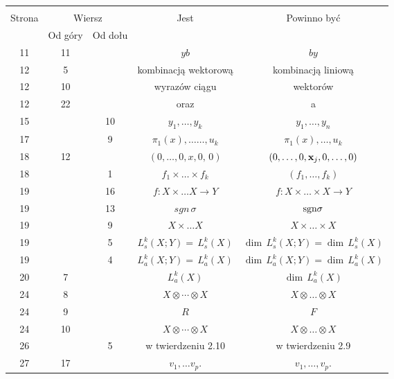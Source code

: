 \documentclass[a4paper,11pt]{article}
\begin{document}
\begin{center}

  \begin{tabular}{|c|c|c|c|c|}
    \hline
    & \multicolumn{2}{c|}{} & & \\
    Strona & \multicolumn{2}{c|}{Wiersz} & Jest
                              & Powinno być \\ \cline{2-3}
    & Od góry & Od dołu & & \\
    \hline
    11  & 11 & & $y b$ & $b y$ \\
    12  &  5 & & kombinacją wektorową &  kombinacją liniową \\
    12  & 10 & & wyrazów ciągu & wektorów \\
    12  & 22 & & oraz & a \\
    15  & & 10 & $y_{ 1 }, \ldots , y_{ k }$ & $y_{ 1 }, \ldots , y_{ n }$ \\
    17  & &  9 & $\pi_{ 1 }( x ), \ldots\ldots, u_{ k }$
           & $\pi_{ 1 }( x ), \ldots, u_{ k }$ \\
    18  & 12 & & $( 0, \ldots, 0, x, 0, \, 0 )$
           & $( 0, \ldots, 0, \mathbf{x}_{ j }, 0, \ldots, 0 )$ \\
    18  & &  1 & $f_{ 1 } \times \ldots \times f_{ k }$
           & $( f_{ 1 }, \ldots, f_{ k } )$ \\
    19  & & 16 & $f : X \times \ldots X \to Y$ & $f : X \times \ldots \times X \to Y$ \\
    19  & & 13 & $sgn\, \sigma$ & $\textrm{sgn} \sigma$ \\
    19  & &  9 & $X \times \ldots X$ & $X \times \ldots \times X$ \\
    19  & &  5 & $L^{ k }_{ s } ( X; Y ) = \, L^{ k }_{ s } ( X )$
           & $\dim \, L^{ k }_{ s } ( X; Y ) = \dim \, L^{ k }_{ s } ( X )$ \\
    19  & &  4 & $L^{ k }_{ a } ( X; Y ) = \, L^{ k }_{ a } ( X )$
           & $\dim \, L^{ k }_{ a } ( X; Y ) = \dim \, L^{ k }_{ a } ( X )$ \\
    20  &  7 & & $L_{ a }^{ k }( X )$ & $\dim \, L_{ a }^{ k }( X )$ \\
    24  &  8 & & $X \otimes \cdots \otimes X$ & $X \otimes \ldots \otimes X$ \\
    24  &  9 & & $R$ & $F$ \\
    24  & 10 & & $X \otimes \cdots \otimes X$ & $X \otimes \ldots \otimes X$ \\
    26  & &  5 & w twierdzeniu 2.10 & w twierdzeniu 2.9 \\
    27  & 17 & & $v_{ 1 }, \ldots v_{ p }$. & $v_{ 1 }, \ldots, v_{ p }$. \\

\end{tabular}
\end{center}
\end{document}
